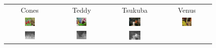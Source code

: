 \documentclass{ipol}
\begin{document}
\begin{figure}[h]
\begin{center}	
\begin{tabular}{cccc}
Cones & Teddy & Tsukuba & Venus\\
\includegraphics[width=0.220\textwidth]{Images/pictures/cones.png} &
\includegraphics[width=0.220\textwidth]{Images/pictures/teddy.png} &
\includegraphics[width=0.245\textwidth]{Images/pictures/tsukuba.png} &
\includegraphics[width=0.210\textwidth]{Images/pictures/venus.png}\\
\includegraphics[width=0.220\textwidth]{Images/theorical_results/cones.png} &
\includegraphics[width=0.220\textwidth]{Images/theorical_results/teddy.png} &
\includegraphics[width=0.245\textwidth]{Images/theorical_results/tsukuba.png} &

\end{tabular}
\end{center}
\end{figure}
\end{document}
